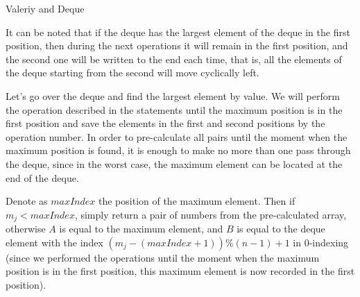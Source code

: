\begin{tutorial}{Valeriy and Deque}

It can be noted that if the deque has the largest element of the deque in the first position, then during the next operations it will remain in the first position, and the second one will be written to the end each time, that is, all the elements of the deque starting from the second will move cyclically left.

Let's go over the deque and find the largest element by value. We will perform the operation described in the statements until the maximum position is in the first position and save the elements in the first and second positions by the operation number. In order to pre-calculate all pairs until the moment when the maximum position is found, it is enough to make no more than one pass through the deque, since in the worst case, the maximum element can be located at the end of the deque.

Denote as $maxIndex$ the position of the maximum element. Then if $m_j <maxIndex$, simply return a pair of numbers from the pre-calculated array, otherwise $A$ is equal to the maximum element, and $B$ is equal to the deque element with the index $(m_j - (maxIndex + 1)) \% (n - 1) + 1$ in $0$-indexing (since we performed the operations until the moment when the maximum position is in the first position, this maximum element is now recorded in the first position).

\end{tutorial}
